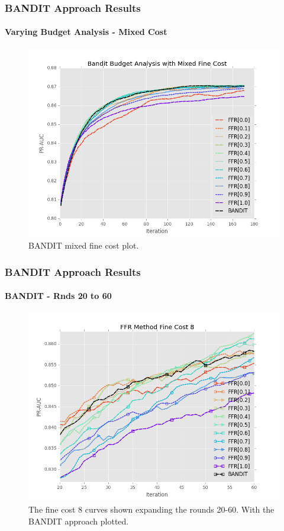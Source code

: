 \documentclass{beamer}
\begin{document}
\begin{frame}
    \frametitle{BANDIT Approach Results}
    \framesubtitle{Varying Budget Analysis - Mixed Cost}
    \begin{figure}[!htb]
        \centering
        \includegraphics[width=0.80\columnwidth]{fig/BanditMixedCostPR}
        \caption{BANDIT mixed fine cost plot.}
        \label{fig:BanditMixedCostPR}
    \end{figure}
\end{frame}
\begin{frame}
    \frametitle{BANDIT Approach Results}
    \framesubtitle{BANDIT - Rnds 20 to 60}
    \begin{figure}[!htb]
        \centering
        \includegraphics[width=0.80\columnwidth]{fig/BANDIT_PR_Cost8_rnds20_60}
        \caption{
        The fine cost 8 curves shown expanding the rounds 20-60. With the BANDIT approach
        plotted.
        }
        \label{fig:BANDIT_PR_Cost8_rnds20_60}
    \end{figure}
\end{frame}
\end{document}
